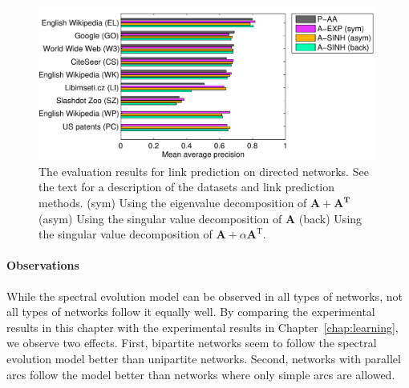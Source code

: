 \documentclass[11pt,a4paper]{book}
\newcommand{\wFull}{0.99}
\begin{document}
\begin{figure}[h!]
  \includegraphics[width=\wFull\textwidth]{img-eps/resultsbar-dir}
  \caption{
    The evaluation results for link prediction on directed networks. 
    See the text for a 
    description of the datasets and link prediction methods. 
    (\textrm{sym}) Using the eigenvalue decomposition of $\mathbf A +
    \mathbf A^{\mathbf T}$  
    (\textrm{asym}) Using the singular value decomposition of $\mathbf
    A$ 
    (\textrm{back}) Using the singular value decomposition of $\mathbf A
    + \alpha \mathbf A^{\mathrm T}$.
  }
  \label{fig:results-dir}
\end{figure}

\paragraph{Observations}

While the spectral evolution model can be observed in all types of
networks, not all types of networks follow it equally well.  
By comparing the experimental results in this chapter with the
experimental results in Chapter~\ref{chap:learning}, 
we observe two effects.  First, bipartite networks seem to follow the
spectral 
evolution model better than unipartite networks.  Second, networks with
parallel arcs follow the model better than networks where only simple
arcs are allowed. 
\end{document}
